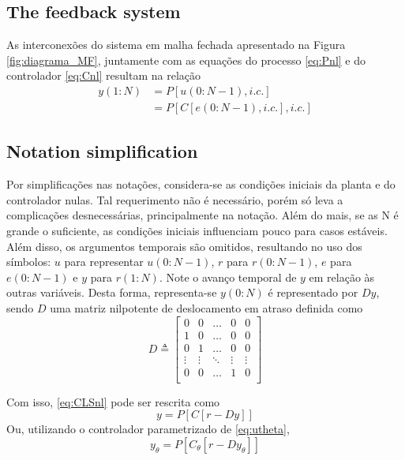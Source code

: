 \subsection{The feedback system}%
\label{sub:o_sistema_realimentado}

As interconexões do sistema em malha fechada apresentado na Figura \ref{fig:diagrama_MF}, juntamente com as equações do processo \eqref{eq:Pnl} e do controlador \eqref{eq:Cnl} resultam na relação
\begin{align}
   y(1: N) &=P[u(0{:} N-1), i . c .] \nonumber \\
   &=P[C[e(0{:} N-1), i . c .], i . c .]
   \label{eq:CLSnl}
\end{align}

\subsection{Notation simplification}%
\label{sub:simplificações_nas_notações}

Por simplificações nas notações, considera-se as condições iniciais da planta e do controlador nulas. Tal requerimento não é necessário, porém só leva  a complicações desnecessárias, principalmente na notação. Além do mais, se as N é grande o suficiente, as condições iniciais influenciam pouco para casos estáveis.
Além disso, os argumentos temporais são omitidos, resultando no uso dos símbolos: $u$ para representar $u(0{:}N-1)$, $r$ para $r(0{:}N-1)$, $e$ para $e(0{:}N-1)$ e  $y$ para $r(1{:}N)$. Note o avanço temporal de $y$ em relação às outras variáveis. Desta forma, representa-se  $y(0{:}N)$ é representado por $Dy$, sendo $D$ uma matriz nilpotente de deslocamento em atraso definida como
\begin{equation}
   D \triangleq \begin{bmatrix} 
      0 & 0 & \dots & 0 & 0 \\
      1 & 0 & \dots & 0 & 0 \\
      0 & 1 & \dots & 0 & 0 \\
      \vdots & \vdots & \ddots & \vdots & \vdots \\
      0 & 0 & \dots & 1 & 0 \\
   \end{bmatrix} 
\label{eq:}
\end{equation}

Com isso, \eqref{eq:CLSnl} pode ser rescrita como
\begin{equation}
   y = P[C[r-Dy]]
   \label{eq:ymf}
\end{equation}
Ou, utilizando o controlador parametrizado de \eqref{eq:utheta},
\begin{equation}
   y_{\theta} = P[C_{\theta}[r-Dy_{\theta}]]
   \label{eq:ytheta}
\end{equation}


